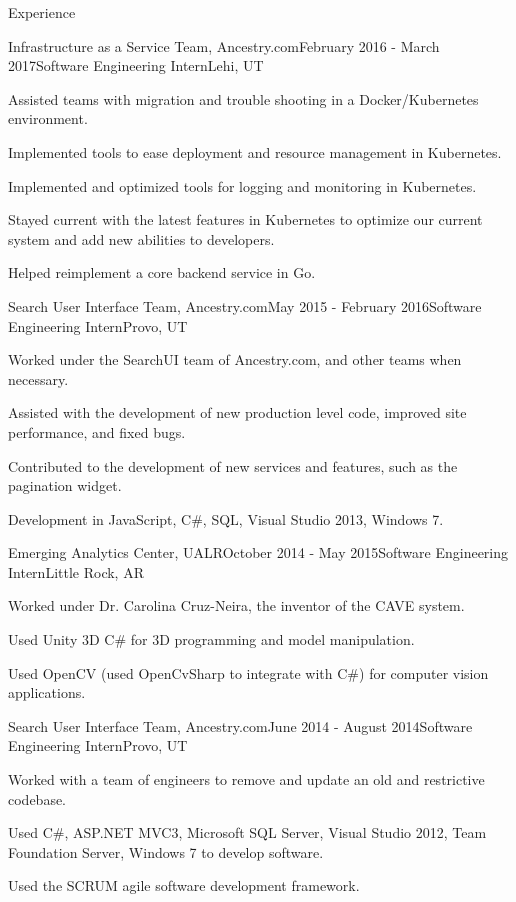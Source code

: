 \documentclass{resume} %
\begin{document}
\begin{rSection}{Experience}
  \begin{rSubsection}{Infrastructure as a Service Team, Ancestry.com}{February 2016 - March 2017}{Software Engineering Intern}{Lehi, UT}
  \item Assisted teams with migration and trouble shooting in a Docker/Kubernetes environment.
  \item Implemented tools to ease deployment and resource management in Kubernetes.
  \item Implemented and optimized tools for logging and monitoring in Kubernetes.
  \item Stayed current with the latest features in Kubernetes to optimize our current system and add new abilities to developers.
  \item Helped reimplement a core backend service in Go.
  \end{rSubsection}

  \begin{rSubsection}{Search User Interface Team, Ancestry.com}{May 2015 - February 2016}{Software Engineering Intern}{Provo, UT}
  \item Worked under the SearchUI team of Ancestry.com, and other teams when necessary.
  \item Assisted with the development of new production level code, improved site performance, and fixed bugs.
  \item Contributed to the development of new services and features, such as the pagination widget.
  \item Development in JavaScript, C\#, SQL, Visual Studio 2013, Windows 7.
  \end{rSubsection}

  \begin{rSubsection}{Emerging Analytics Center, UALR}{October 2014 - May 2015}{Software Engineering Intern}{Little Rock, AR}
  \item Worked under Dr. Carolina Cruz-Neira, the inventor of the CAVE system.
  \item Used Unity 3D C\# for 3D programming and model manipulation.
  \item Used OpenCV (used OpenCvSharp to integrate with C\#) for computer vision applications.
  \end{rSubsection}

  \begin{rSubsection}{Search User Interface Team, Ancestry.com}{June 2014 - August 2014}{Software Engineering Intern}{Provo, UT}
  \item Worked with a team of engineers to remove and update an old and restrictive codebase.
  \item Used C\#, ASP.NET MVC3, Microsoft SQL Server, Visual Studio 2012, Team Foundation Server, Windows 7 to develop software.
  \item Used the SCRUM agile software development framework.
  \end{rSubsection}

\end{rSection}
\end{document}
